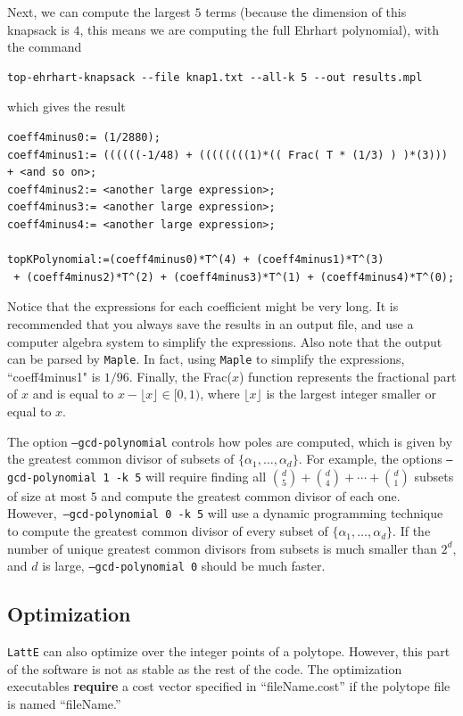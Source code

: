 \documentclass{article}
\newcommand{\latte}{{\tt LattE}\xspace}
\newcommand{\maple}{{\tt Maple}\xspace}
\begin{document}
Next, we can compute the largest $5$ terms (because the dimension of this knapsack is $4$, this means we are computing the full Ehrhart polynomial), with the command
\begin{verbatim}
top-ehrhart-knapsack --file knap1.txt --all-k 5 --out results.mpl
\end{verbatim}
which gives the result
\begin{verbatim}
coeff4minus0:= (1/2880);
coeff4minus1:= ((((((-1/48) + ((((((((1)*(( Frac( T * (1/3) ) )*(3))) + <and so on>;
coeff4minus2:= <another large expression>;
coeff4minus3:= <another large expression>;
coeff4minus4:= <another large expression>;

topKPolynomial:=(coeff4minus0)*T^(4) + (coeff4minus1)*T^(3) 
 + (coeff4minus2)*T^(2) + (coeff4minus3)*T^(1) + (coeff4minus4)*T^(0);
\end{verbatim}
  
Notice that the expressions for each coefficient might be very long. It is recommended that you always save the results in an output file, and use a computer algebra system to simplify the expressions. Also note that the output can be parsed by \maple. In fact, using \maple to simplify the expressions, ``coeff4minus1" is $1/96$. Finally, the Frac($x$) function represents the fractional part of $x$ and is equal to $x - \lfloor x \rfloor \in [0,1)$, where $\lfloor x \rfloor$ is  the largest integer smaller or equal to $x$.

The option {\tt --gcd-polynomial} controls how poles are computed, which is given by the greatest common divisor of subsets of $\{\alpha_1 , \dots, \alpha_d\}$. For example, the options {\tt --gcd-polynomial 1 -k 5} will require finding all $\binom{d}{5}+\binom{d}{4}+\cdots+\binom{d}{1}$ subsets of size at most $5$ and compute the greatest common divisor of each one. However,~{\tt --gcd-polynomial 0 -k 5} will use a dynamic programming technique to compute the greatest common divisor of every subset of $\{\alpha_1 , \dots, \alpha_d\}$. If the number of unique greatest common divisors from subsets is much smaller than $2^d$, and $d$ is large, {\tt --gcd-polynomial 0} should be much faster. 


\subsection{Optimization}


\latte can also optimize over the integer points of a polytope. However, this part of the software is not as stable as the rest of the code. The optimization executables {\bf require} a cost vector specified in ``fileName.cost'' if the polytope file is named ``fileName.''
\end{document}
